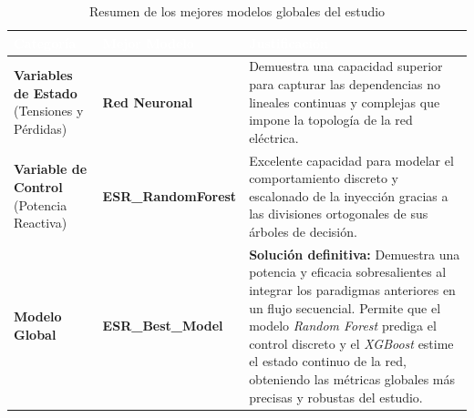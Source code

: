 \begin{table}[htbp]
	\centering
	\renewcommand{\arraystretch}{1.3}
	\begin{tabular}{|p{3cm}|p{4cm}|p{8cm}|}
		\hline
		\rowcolor[HTML]{5B9BD5}
		\textcolor{white}{\textbf{Categoría}} & \textcolor{white}{\textbf{Mejor Modelo}} & \textcolor{white}{\textbf{Justificación}} \\ \hline
		
		\textbf{Variables de Estado} \newline (Tensiones y Pérdidas) & \textbf{Red Neuronal} & Demuestra una capacidad superior para capturar las dependencias no lineales continuas y complejas que impone la topología de la red eléctrica. \\ \hline
		
		\textbf{Variable de Control} \newline (Potencia Reactiva) & \textbf{ESR\_RandomForest} & Excelente capacidad para modelar el comportamiento discreto y escalonado de la inyección gracias a las divisiones ortogonales de sus árboles de decisión. \\ \hline
		
		\rowcolor[HTML]{DCE6F1}
		\textbf{Modelo Global} & \textbf{ESR\_Best\_Model} & \textbf{Solución definitiva:} Demuestra una potencia y eficacia sobresalientes al integrar los paradigmas anteriores en un flujo secuencial. Permite que el modelo \textit{Random Forest} prediga el control discreto y el \textit{XGBoost} estime el estado continuo de la red, obteniendo las métricas globales más precisas y robustas del estudio. \\ \hline
	\end{tabular}
	\caption{Resumen de los mejores modelos globales del estudio}
	\label{tab:resumen-mejor-modelo}
\end{table}